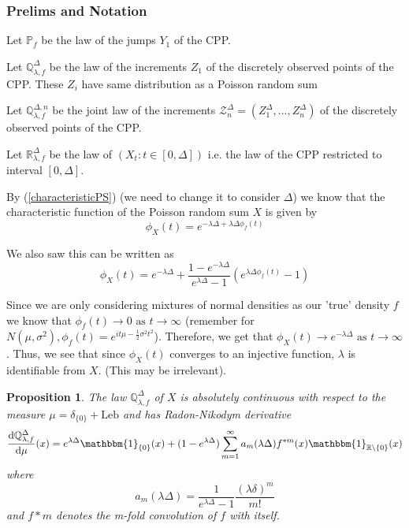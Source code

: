 \documentclass[a4paper,11pt]{article}
\theoremstyle{theorem}
\newtheorem{prop}{Proposition}[section]
\theoremstyle{definition}
\theoremstyle{remark}
\begin{document}
\subsubsection{Prelims and Notation}

Let $\mathbb{P}_{f}$ be the law of the jumps $Y_1$ of the CPP.

Let $\mathbb{Q}_{\lambda, f}^{\Delta}$ be the law of the increments $Z_1$ of the discretely observed points of the CPP. These $Z_i$ have same distribution as a Poisson random sum

Let $\mathbb{Q}_{\lambda, f}^{\Delta, n}$ be the joint law of the increments $\mathcal{Z}_{n}^{\Delta} = (Z_{1}^{\Delta}, \dotsc, Z_{n}^{\Delta})$ of the discretely observed points of the CPP.

Let $\mathbb{R}_{\lambda, f}^{\Delta}$ be the law of $(X_t : t \in [0, \Delta])$ i.e. the law of the CPP restricted to interval $[0, \Delta]$.

By (\ref{characteristicPS}) (we need to change it to consider $\Delta$) we know that the characteristic function of the Poisson random sum $X$ is given by
\[
\phi_{X}(t) = e^{-\lambda \Delta + \lambda \Delta \phi_{f}(t)}
\]

We also saw this can be written as 
\[
\phi_{X}(t) = e^{-\lambda \Delta} + \frac{1 - e^{-\lambda \Delta}}{e^{\lambda \Delta} - 1}(e^{\lambda \Delta \phi_{f}(t)} - 1)
\]

Since we are only considering mixtures of normal densities as our 'true' density $f$ we know that $\phi_{f}(t) \to 0 \text{ as } t \to \infty$ (remember for $N(\mu, \sigma^2), \phi_{f}(t) = e^{it\mu - \frac{1}{2}\sigma^2 t^2}$). Therefore, we get that $\phi_{X}(t) \to e^{-\lambda \Delta} \text{ as } t \to \infty$. Thus, we see that since $\phi_{X}(t)$ converges to an injective function, $\lambda$ is identifiable from $X$. (This may be irrelevant).

\begin{prop}
The law $\mathbb{Q}_{\lambda, f}^{\Delta}$ of $X$ is absolutely continuous with respect to the measure $\mu = \delta_{\{0\}} + \mathrm{Leb}$ and has Radon-Nikodym derivative
\begin{equation} \label{Radon-Nikodym}
\frac{\mathrm{d}\mathbb{Q}_{\lambda, f}^{\Delta}}{\mathrm{d}\mu}(x) = e^{\lambda \Delta} \mathbbm{1}_{\{0\}}(x) + (1 - e^{\lambda \Delta})\sum_{m=1}^{\infty}{a_m(\lambda \Delta) f^{\ast m}(x)\mathbbm{1}_{\mathbb{R}\setminus \{0\}}(x)}
\end{equation}
where
\begin{equation}
a_m(\lambda \Delta) = \frac{1}{e^{\lambda \Delta} - 1}\frac{(\lambda \delta)^m}{m!}
\end{equation}
and $f*m$ denotes the m-fold convolution of $f$ with itself.
\end{prop}
\end{document}
